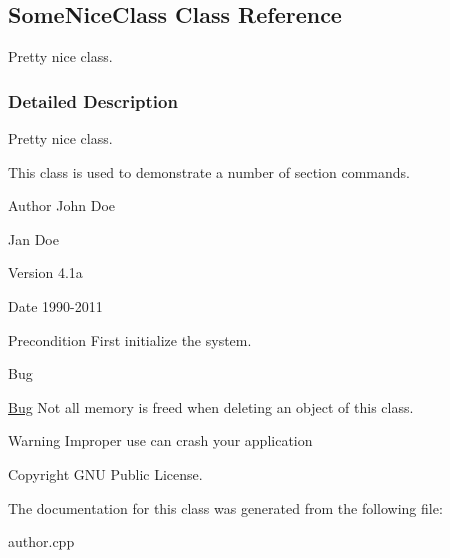 \hypertarget{class_some_nice_class}{}\subsection{Some\+Nice\+Class Class Reference}
\label{class_some_nice_class}


Pretty nice class.  




\subsubsection{Detailed Description}
Pretty nice class. 

This class is used to demonstrate a number of section commands. \begin{DoxyAuthor}{Author}
John Doe 

Jan Doe 
\end{DoxyAuthor}
\begin{DoxyVersion}{Version}
4.\+1a 
\end{DoxyVersion}
\begin{DoxyDate}{Date}
1990-\/2011 
\end{DoxyDate}
\begin{DoxyPrecond}{Precondition}
First initialize the system. 
\end{DoxyPrecond}
\begin{DoxyRefDesc}{Bug}
\item[\mbox{\hyperlink{bug__bug000001}{Bug}}]Not all memory is freed when deleting an object of this class. \end{DoxyRefDesc}
\begin{DoxyWarning}{Warning}
Improper use can crash your application 
\end{DoxyWarning}
\begin{DoxyCopyright}{Copyright}
G\+NU Public License. 
\end{DoxyCopyright}


The documentation for this class was generated from the following file\+:\begin{DoxyCompactItemize}
\item 
author.\+cpp\end{DoxyCompactItemize}
